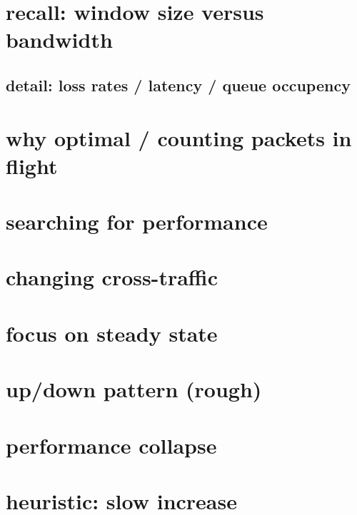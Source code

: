 
\section{recall: window size versus bandwidth}



\subsection{detail: loss rates / latency / queue occupency}
\section{why optimal / counting packets in flight}


\section{searching for performance}


\section{changing cross-traffic}


\section{focus on steady state}


\section{up/down pattern (rough)}



\section{performance collapse}


\section{heuristic: slow increase}



